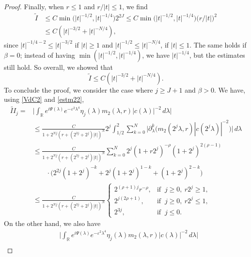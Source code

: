 \documentclass[10pt,leqno]{amsart}
\numberwithin{equation}{section}
\newcommand{\field}[1]{\mathbb{#1}}
\newcommand{\R}{\field{R}}          		%
\begin{document}
\begin{proof}
Finally, when $r\leq 1$ and $r/|t| \leq 1$, we find
\begin{align*}
\tilde{I} &\leq C \min \big(|t|^{-1/2},|t|^{-1/4}\big) 2^{2 J} \leq C \min \big(|t|^{-1/2},|t|^{-1/4}\big) \big(r/|t|\big)^2\\
& \leq C (|t|^{-3/2}+|t|^{-N/4}),
\end{align*}
since $|t|^{-1/4-2 }\leq |t|^{-3/2}$ if $|t|\geq 1$ and $|t|^{-1/2 }\leq |t|^{-N/4}$, if $|t|\leq 1$.
The same holds if $\beta = 0$; instead of having $\min (|t|^{-1/2},|t|^{-1/4})$, we have $|t|^{-1/4}$, but the estimates still hold. So overall, we showed that
$$\tilde{I} \leq C (|t|^{-3/2}+|t|^{-N/4}). $$
To conclude the proof, we consider the case where 
$j\ge J+1$ and $\beta> 0$. %
We have, using \eqref{VdC2} and \eqref{estm22},
\begin{align}\label{esttilde2}
\widetilde{II}_j=
&\Big|\int_\R e^{i\Psi(\lambda)}e^{-\varepsilon^2 \lambda^4} \eta_{j}(\lambda) m_2 (\lambda ,r) |c(\lambda )|^{-2}\, d\lambda\Big|\nonumber\\
&\leq  \frac{C}{1+2^{Nj}(r+(2^{3j}+2^j) |t|)^N} 2^j \int_{1/2}^2 \sum_{k=0}^{N}
\big|\partial_\lambda^k\big(m_2 (2^j\lambda ,r) | c(2^j\lambda)|^{-2}\big)\big|\, d\lambda \nonumber\\
&\leq  \frac{C}{1+2^{Nj}( r+(2^{3j}+2^j)|t|)^N} \sum_{k=0}^{N} 2^j  (1+ r 2^j)^{-\rho} (1+2^j)^{2 (\rho -1)} \nonumber\\
&\qquad \cdot    \big(2^{2j} (1+2^j)^{ -k} + 2^j(1+2^j)^{1- k} +(1+2^j)^{2-k}\big)\nonumber\\
&\leq  \frac{C}{1+2^{Nj}( r+(2^{3j}+2^j)|t|)^N} \begin{cases} 2^{(\rho +1) j}r^{-\rho},&\mbox{if }\ j\geq 0,\ r2^j \geq 1,\\ 2^{j (2\rho +1) }   ,&\mbox{if }\ j\geq 0,\ r2^j \leq 1,
\\ 2^{3j} ,&\mbox{if }\ j\leq 0 . \end{cases}
\end{align}
On the other hand, we also have 
\begin{align*}
&\Big|\int_\R e^{i\Psi(\lambda)}e^{-\varepsilon^2 \lambda^4} \eta_{j}(\lambda) m_2 (\lambda ,r) |c(\lambda) |^{-2}\, d\lambda\Big|\\

\end{align*}
\end{proof}
\end{document}
